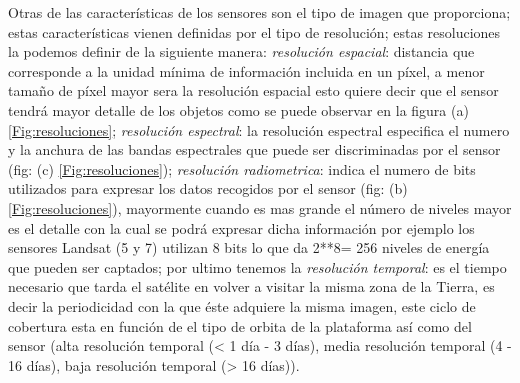 Otras de las características de los sensores son el tipo de imagen que proporciona; estas características vienen definidas por el tipo de resolución; estas resoluciones la podemos definir de la siguiente manera: \textit{resolución espacial}: distancia que corresponde a la unidad mínima de información incluida en un píxel, a menor tamaño de píxel mayor sera la resolución espacial esto quiere decir que el sensor tendrá mayor detalle de los objetos como se puede observar en la figura (a) \ref{Fig:resoluciones};  
\textit{resolución espectral}: la resolución espectral especifica el numero y la anchura de las bandas espectrales que puede ser discriminadas por el sensor (fig: (c) \ref{Fig:resoluciones}); \textit{resolución radiometrica}: indica el numero de bits utilizados para expresar los datos recogidos por el sensor (fig: (b) \ref{Fig:resoluciones}), mayormente cuando es mas grande el número de niveles mayor es el detalle con la cual se podrá expresar dicha información por ejemplo los sensores Landsat (5 y 7) utilizan 8 bits lo que da 2**8= 256 niveles de energía que pueden ser captados; por ultimo tenemos la \textit{resolución temporal}: es el tiempo necesario que tarda el satélite en volver a visitar la misma zona de la Tierra, es decir la periodicidad con la que éste adquiere la misma imagen, este ciclo de cobertura esta en función de el tipo de orbita de la plataforma así como del sensor (alta resolución temporal (< 1 día - 3 días), media resolución temporal (4 - 16 días), baja resolución temporal (> 16 días)).



